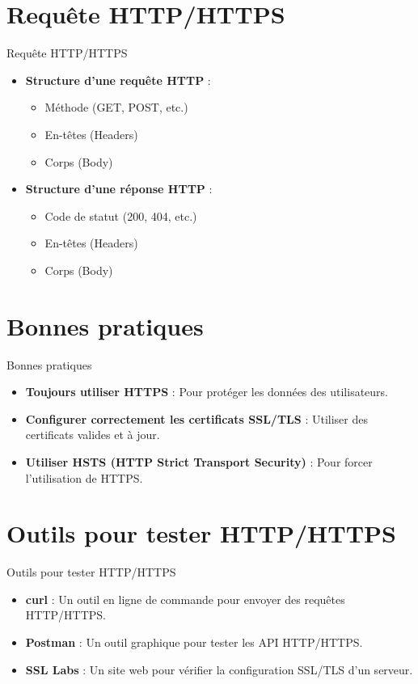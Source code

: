 \documentclass{clbeamer2024}
\begin{document}
\section{Requête HTTP/HTTPS}
\begin{frame}{Requête HTTP/HTTPS}
	\begin{itemize}
		\item \textbf{Structure d'une requête HTTP} :
		\begin{itemize}
			\item Méthode (GET, POST, etc.)
			\item En-têtes (Headers)
			\item Corps (Body)
		\end{itemize}
		\item \textbf{Structure d'une réponse HTTP} :
		\begin{itemize}
			\item Code de statut (200, 404, etc.)
			\item En-têtes (Headers)
			\item Corps (Body)
		\end{itemize}
	\end{itemize}
\end{frame}

\section{Bonnes pratiques}
\begin{frame}{Bonnes pratiques}
	\begin{itemize}
		\item \textbf{Toujours utiliser HTTPS} : Pour protéger les données des utilisateurs.
		\item \textbf{Configurer correctement les certificats SSL/TLS} : Utiliser des certificats valides et à jour.
		\item \textbf{Utiliser HSTS (HTTP Strict Transport Security)} : Pour forcer l'utilisation de HTTPS.
	\end{itemize}
\end{frame}

\section{Outils pour tester HTTP/HTTPS}
\begin{frame}{Outils pour tester HTTP/HTTPS}
	\begin{itemize}
		\item \textbf{curl} : Un outil en ligne de commande pour envoyer des requêtes HTTP/HTTPS.
		\item \textbf{Postman} : Un outil graphique pour tester les API HTTP/HTTPS.
		\item \textbf{SSL Labs} : Un site web pour vérifier la configuration SSL/TLS d'un serveur.
	\end{itemize}
	\end{frame}
	
\end{document}
